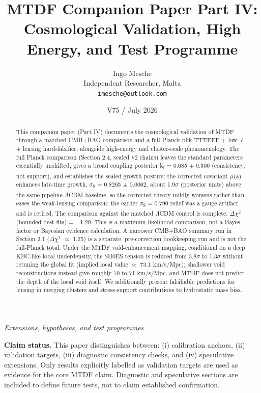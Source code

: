 \documentclass[11pt,a4paper]{article}
\title{MTDF Companion Paper Part IV: Cosmological Validation, High Energy, and Test Programme}
\author{Ingo Mesche\\ \small Independent Researcher, Malta \\ \small \texttt{imesche@outlook.com}}
\date{V75 / July 2026}
\begin{document}
\maketitle
\begin{center}\itshape Extensions, hypotheses, and test programmes\end{center}



\tableofcontents

\begin{abstract}
This companion paper (Part IV) documents the cosmological validation of MTDF through a matched CMB+BAO comparison and a full Planck plik TTTEEE + low-$\ell$ + lensing hard-falsifier, alongside high-energy and cluster-scale phenomenology. The full Planck comparison (Section 2.4, sealed v2 chains) leaves the standard parameters essentially unshifted, gives a broad coupling posterior k\textsubscript{f} = 0.685 $\pm$ 0.500 (consistency, not support), and establishes the sealed growth posture: the corrected covariant $\mu$(a) enhances late-time growth, $\sigma$\textsubscript{8} = 0.8265 $\pm$ 0.0062, about 1.9$\sigma$ (posterior units) above the same-pipeline $\Lambda$CDM baseline, so the corrected theory mildly worsens rather than eases the weak-lensing comparison; the earlier $\sigma$\textsubscript{8} = 0.790 relief was a gauge artifact and is retired. The comparison against the matched $\Lambda$CDM control is complete: $\Delta$$\chi$$^{2}$ (bounded best fits) = $-$1.29. This is a maximum-likelihood comparison, not a Bayes factor or Bayesian evidence calculation. A narrower CMB+BAO summary run in Section 2.1 ($\Delta$$\chi$$^{2}$ $\approx$ 1.25) is a separate, pre-correction bookkeeping run and is not the full-Planck total. Under the MTDF void-enhancement mapping, conditional on a deep KBC-like local underdensity, the SH0ES tension is reduced from 3.8$\sigma$ to 1.3$\sigma$ without retuning the global fit (implied local value $\approx$ 73.1 km/\allowbreak{}s/\allowbreak{}Mpc); shallower void reconstructions instead give roughly 70 to 71 km/\allowbreak{}s/\allowbreak{}Mpc, and MTDF does not predict the depth of the local void itself. We additionally present falsifiable predictions for lensing in merging clusters and stress-support contributions to hydrostatic mass bias.
\end{abstract}

\begin{mdframed}[linecolor=accent,linewidth=0.5pt,backgroundcolor=callout-bg,leftline=true,rightline=true,topline=true,bottomline=true,innerleftmargin=8pt,innerrightmargin=8pt,innertopmargin=6pt,innerbottommargin=6pt]
\textbf{Claim status.}
This paper distinguishes between:
(i) calibration anchors,
(ii) validation targets,
(iii) diagnostic consistency checks, and
(iv) speculative extensions.
Only results explicitly labelled as validation targets are used as evidence for the core MTDF claim. Diagnostic and speculative sections are included to define future tests, not to claim established confirmation.
\end{mdframed}
\end{document}
